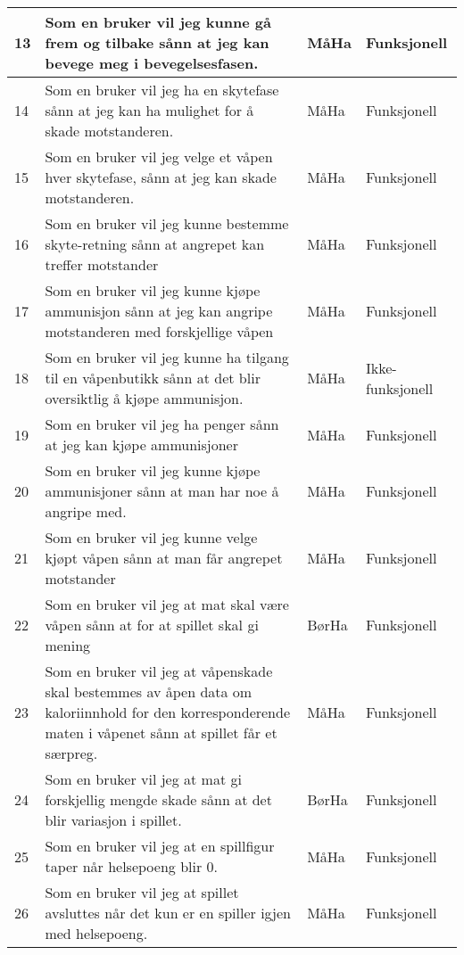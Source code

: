 \documentclass[norsk,a4paper]{article}
\begin{document}
\begin{center}
\begin{tabular}{ | m{0.4cm} | m{6.1cm} | m{2cm} | m{3cm} | }
\hline
13&Som en bruker vil jeg kunne gå frem og tilbake sånn at jeg kan bevege meg i bevegelsesfasen.&MåHa & Funksjonell\\ \hline
14&Som en bruker vil jeg ha en skytefase sånn at jeg kan ha mulighet for å skade motstanderen.&MåHa & Funksjonell\\ \hline
15&Som en bruker vil jeg velge et våpen hver skytefase, sånn at jeg kan skade motstanderen.&MåHa & Funksjonell\\ \hline
16&Som en bruker vil jeg kunne bestemme skyte-retning sånn at angrepet kan treffer motstander&MåHa & Funksjonell\\ \hline
17&Som en bruker vil jeg kunne kjøpe ammunisjon sånn at jeg kan angripe motstanderen med forskjellige våpen&MåHa & Funksjonell\\ \hline
18&Som en bruker vil jeg kunne ha tilgang til en våpenbutikk sånn at det blir oversiktlig å kjøpe ammunisjon.&MåHa &Ikke-funksjonell\\ \hline
19&Som en bruker vil jeg ha penger sånn at jeg kan kjøpe ammunisjoner&MåHa & Funksjonell\\ \hline
20&Som en bruker vil jeg kunne kjøpe ammunisjoner sånn at man har noe å angripe med.&MåHa & Funksjonell\\ \hline
21&Som en bruker vil jeg kunne velge kjøpt våpen sånn at man får angrepet motstander&MåHa & Funksjonell\\ \hline
22&Som en bruker vil jeg at mat skal være våpen sånn at for at spillet skal gi mening&BørHa & Funksjonell\\ \hline
23&Som en bruker vil jeg at våpenskade skal bestemmes av åpen data om kaloriinnhold for den korresponderende maten i våpenet sånn at spillet får et særpreg.&MåHa & Funksjonell\\ \hline
24&Som en bruker vil jeg at mat gi forskjellig mengde skade sånn at det blir variasjon i spillet.&BørHa & Funksjonell\\ \hline
25&Som en bruker vil jeg at en spillfigur taper når helsepoeng blir 0.&MåHa & Funksjonell\\ \hline
26&Som en bruker vil jeg at spillet avsluttes når det kun er en spiller igjen med helsepoeng.&MåHa & Funksjonell\\ \hline
\end{tabular}
\end{center}
\end{document}
